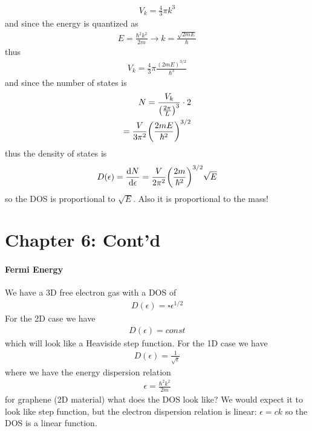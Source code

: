 \documentclass[../main.tex]{subfiles}
\begin{document}
\begin{align*}
    V_k = \frac{4}{3} \pi k^3
\end{align*}
and since the energy is quantized as
\begin{align*}
    E = \frac{\hbar^2 k^2}{2m} \to k = \frac{\sqrt{2mE}}{\hbar}
\end{align*}
thus
\begin{align*}
    V_k = \frac{4}{3} \pi \frac{(2mE)^{3/2}}{\hbar^3}
\end{align*}
and since the number of states is
\begin{align*}
    N = \frac{V_k}{\qt(\frac{2\pi}{L})^3} \cdot 2 \\
    = \frac{V}{3\pi^2} \qt(\frac{2mE}{\hbar^2})^{3/2}
\end{align*}
thus the density of states is
\begin{align*}
    D(\epsilon) = \dv{N}{\epsilon} = \frac{V}{2\pi^2} \qt(\frac{2m}{\hbar^2})^{3/2} \sqrt{E}
\end{align*}
so the DOS is proportional to $\sqrt{E}$. Also it is proportional to the mass!


\newpage
{}

\section*{Chapter 6: Cont'd}

\paragraph*{Fermi Energy} We have a 3D free electron gas with a DOS of
\begin{align*}
    D(\epsilon) = \square \epsilon^{1/2}
\end{align*}
For the 2D case we have 
\begin{align*}
    D(\epsilon) = const
\end{align*}
which will look like a Heaviside step function. For the 1D case we have
\begin{align*}
    D(\epsilon) = \frac{1}{\sqrt{\epsilon}}
\end{align*}
where we have the energy dispersion relation
\begin{align*}
    \epsilon = \frac{\hbar^2 k^2}{2m}
\end{align*}
for graphene (2D material) what does the DOS look like? We would expect it to look like step
function, but the electron dispersion relation is linear: $\epsilon = c k$ so the DOS is 
a linear function.
\end{document}
